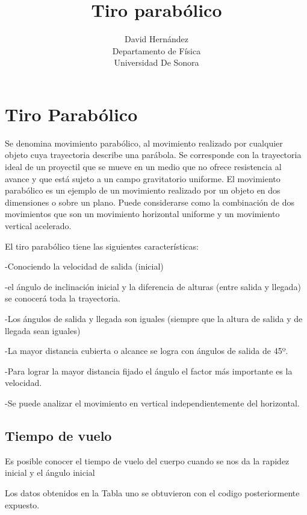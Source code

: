 \documentclass{article}
\title{Tiro parabólico}
\author{David Hernández\\ Departamento de Física \\ Universidad De Sonora}
\begin{document}
\maketitle
\section {Tiro Parabólico}

Se denomina movimiento parabólico, al movimiento realizado por cualquier objeto cuya trayectoria describe una parábola. Se corresponde con la trayectoria ideal de un proyectil que se mueve en un medio que no ofrece resistencia al avance y que está sujeto a un campo gravitatorio uniforme. El movimiento parabólico es un ejemplo de un movimiento realizado por un objeto en dos dimensiones o sobre un plano. Puede considerarse como la combinación de dos movimientos que son un movimiento horizontal uniforme y un movimiento vertical acelerado.


El tiro parabólico tiene las siguientes características:


-Conociendo la velocidad de salida (inicial)

-el ángulo de inclinación inicial y la diferencia de alturas (entre salida y llegada) se conocerá toda la trayectoria.

-Los ángulos de salida y llegada son iguales (siempre que la altura de salida y de llegada sean iguales)

-La mayor distancia cubierta o alcance se logra con ángulos de salida de 45º.

-Para lograr la mayor distancia fijado el ángulo el factor más importante es la velocidad.

-Se puede analizar el movimiento en vertical independientemente del horizontal.

\subsection{Tiempo de vuelo}
Es posible conocer el tiempo de vuelo del cuerpo cuando se nos da la rapidez inicial y el ángulo inicial


Los datos obtenidos en la Tabla uno se obtuvieron con el codigo posteriormente expuesto.
\end{document}
